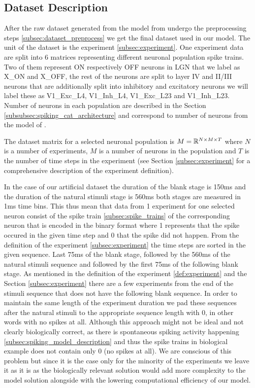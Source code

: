 \subsection{Dataset Description}
\label{subsec:dataset_description}

After the raw dataset generated from the model from \citet{antolik2024comprehensive} undergo the preprocessing steps \ref{subsec:dataset_preprocess} we get the final dataset used in our model. The unit of the dataset is the experiment \ref{subsec:experiment}. One experiment data are split into 6 matrices representing different neuronal population spike trains. Two of them represent ON respectively OFF neurons in LGN that we label as X\_ON and X\_OFF, the rest of the neurons are split to layer IV and II/III neurons that are additionally split into inhibitory and excitatory neurons we will label these as V1\_Exc\_L4, V1\_Inh\_L4, V1\_Exc\_L23 and V1\_Inh\_L23. Number of neurons in each population are described in the Section \ref{subsubsec:spiking_cat_architecture} and correspond to number of neurons from the model of \citet{antolik2024comprehensive}.

The dataset matrix for a selected neuronal population is $M = \mathbb{R}^{N \times M \times T}$ where $N$ is a number of experiments, $M$ is a number of neurons in the population and $T$ is the number of time steps in the experiment (see Section \ref{subsec:experiment} for a comprehensive description of the experiment definition).

In the case of our artificial dataset the duration of the blank stage is 150ms and the duration of the natural stimuli stage is 560ms both stages are measured in 1ms time bins. This thus mean that data from 1 experiment for one selected neuron consist of the spike train \ref{subsec:spike_trains} of the corresponding neuron that is encoded in the binary format where 1 represents that the spike occured in the given time step and 0 that the spike did not happen. From the definition of the experiment \ref{subsec:experiment} the time steps are sorted in the given sequence. Last 75ms of the blank stage, followed by the 560ms of the natural stimuli sequence and followed by the first 75ms of the following blank stage. As mentioned in the definition of the experiment \ref{def:experiment} and the Section \ref{subsec:experiment} there are a few experiments from the end of the stimuli sequence that does not have the following blank sequence. In order to maintain the same length of the experiment duration we pad these sequences after the natural stimuli to the appropriate sequence length with 0, in other words with no spikes at all. Although this approach might not be ideal and not clearly biologically correct, as there is spontaneous spiking activity happening \ref{subsec:spiking_model_description} and thus the spike trains in biological example does not contain only 0 (no spikes at all). We are conscious of this problem but since it is the case only for the minority of the experiments we leave it as it is as the biologically relevant solution would add more complexity to the model solution alongside with the lowering computational efficiency of our model.

